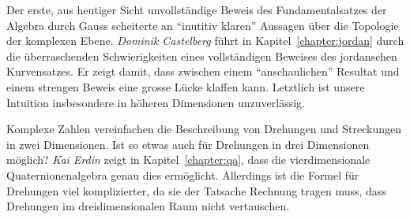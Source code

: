 %
%
Der erste, aus heutiger Sicht unvollständige Beweis des Fundamentalsatzes
der Algebra durch Gauss scheiterte an ``inutitiv klaren'' Aussagen über
die Topologie der komplexen Ebene.
\emph{Dominik Castelberg}
%
%
führt in Kapitel~\ref{chapter:jordan} durch die überraschenden
Schwierigkeiten eines vollständigen Beweises des jordanschen Kurvensatzes.
Er zeigt damit, dass zwischen einem ``anschaulichen'' Resultat und einem
strengen Beweis eine grosse Lücke klaffen kann.
Letztlich ist unsere Intuition insbesondere in höheren Dimensionen
unzuverlässig.

%
%
Komplexe Zahlen vereinfachen die Beschreibung von Drehungen und Streckungen
in zwei Dimensionen.
Ist so etwas auch für Drehungen in drei Dimensionen möglich?
\emph{Kai Erdin}
%
%
zeigt in Kapitel~\ref{chapter:qa}, dass die vierdimensionale
Quaternionenalgebra genau dies ermöglicht.
Allerdings ist die Formel für Drehungen viel komplizierter, da sie
der Tatsache Rechnung tragen muss, dass Drehungen im dreidimensionalen
Raum nicht vertauschen.


